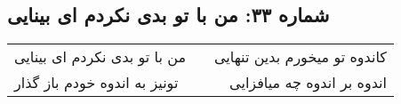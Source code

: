 \begin{center}
\section*{شماره ۳۳: من با تو بدی نکردم ای بینایی}
\label{sec:033}
\begin{longtable}{l p{0.5cm} r}
من با تو بدی نکردم ای بینایی
&&
کاندوه تو میخورم بدین تنهایی
\\
تونیز به اندوه خودم باز گذار
&&
اندوه بر اندوه چه میافزایی
\\
\end{longtable}
\end{center}
